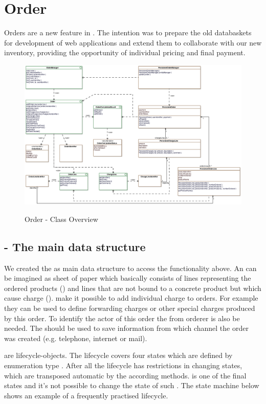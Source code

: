 \newpage
\section{Order}
Orders are a new feature in \salespoint. The intention was to prepare the old databaskets for development of web applications and extend them to collaborate with our new inventory, providing the opportunity of individual pricing and final payment.

\begin{figure}[ht]
	\centering
  \includegraphics[width=1.0\textwidth]{images/Order_Overview.eps}
	\label{order_overview}
	\caption{Order - Class Overview}
\end{figure}

\subsection{ - The main data structure}
We created the  as main data structure to access the functionality above. An  can be imagined as sheet of paper which basically consists of lines representing the ordered products () and lines that are not bound to a concrete product but which cause charge ().  make it possible to add individual charge to orders. For example they can be used to define forwarding charges or other special charges produced by this order.
To identify the actor of this order the  from orderer is also be needed. The  should be used to save information from which channel the order was created (e.g. telephone, internet or mail).

 are lifecycle-objects. The lifecycle covers four states which are defined by enumeration type . After all the lifecycle has restrictions in changing states, which are transposed automatic by the according methods.  is one of the final states and it's not possible to change the state of such . The state machine below shows an example of a frequently practised lifecycle.

